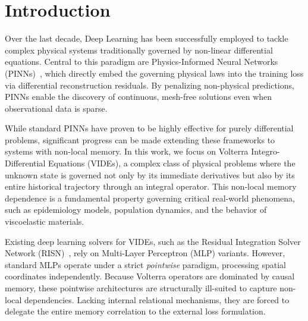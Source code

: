 
\section{Introduction}
\label{sec:introduction}

Over the last decade, Deep Learning has been successfully employed to tackle complex physical systems traditionally governed by non-linear differential equations. Central to this paradigm are Physics-Informed Neural Networks (PINNs)~\cite{raissi2019physics}, which directly embed the governing physical laws into the training loss via differential reconstruction residuals. By penalizing non-physical predictions, PINNs enable the discovery of continuous, mesh-free solutions even when observational data is sparse.

While standard PINNs have proven to be highly effective for purely differential problems, significant progress can be made extending these frameworks to systems with non-local memory. In this work, we focus on Volterra Integro-Differential Equations (VIDEs), a complex class of physical problems where the unknown state is governed not only by its immediate derivatives but also by its entire historical trajectory through an integral operator. This non-local memory dependence is a fundamental property governing critical real-world phenomena, such as epidemiology models, population dynamics, and the behavior of viscoelastic materials.

Existing deep learning solvers for VIDEs, such as the Residual Integration Solver Network (RISN)~\cite{moghaddam2025risn}, rely on Multi-Layer Perceptron (MLP) variants. However, standard MLPs operate under a strict \textit{pointwise} paradigm, processing spatial coordinates independently. Because Volterra operators are dominated by causal memory, these pointwise architectures are structurally ill-suited to capture non-local dependencies. Lacking internal relational mechanisms, they are forced to delegate the entire memory correlation to the external loss formulation.

